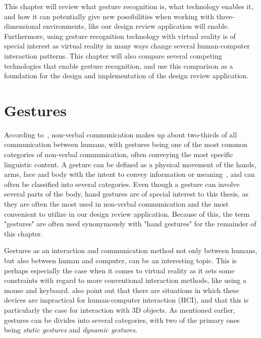 This chapter will review what gesture recognition is, what technology enables it, and how it can potentially give new possibilities when working
with three-dimensional environments, like our design review application will enable. Furthermore, using gesture recognition technology with virtual reality is 
of special interest as virtual reality in many ways change several human-computer interaction patterns. This chapter will also compare several competing 
technologies that enable gesture recognition, and use this comparison as a foundation for the design and implementation of the design review application.  

\section{Gestures}
According to~\citet{Hogan2003}, non-verbal communication makes up about two-thirds of all communication between humans, with gestures being one of the most common 
categories of non-verbal communication, often conveying the most specific linguistic content.
A gesture can be defined as a physical movement of the hands, arms, face and body with the intent to convey information or meaning~\citep{Mitra2007}, 
and can often be classified into several categories. Even though 
a gesture can involve several parts of the body, hand gestures are of special interest to this thesis, as they are often the most used in non-verbal communication
and the most convenient to utilize in our design review application. 
Because of this, the term "gestures" are often used synonymously with "hand gestures" for the remainder of this chapter.

Gestures as an interaction and communication method not only between humans, but also between human and computer, can be an interesting topic. 
This is perhaps especially the case when it comes to virtual reality as it sets some constraints with regard to more conventional interaction methods, like using 
a mouse and keyboard. \citet{Rautaray2015} also point out that there are situations in which
these devices are impractical for human-computer interaction (HCI), and that this is particularly the case for interaction with 3D objects.
As mentioned earlier, gestures can be divides into several categories, with two of the primary ones being \textit{static gestures} and \textit{dynamic gestures}.

